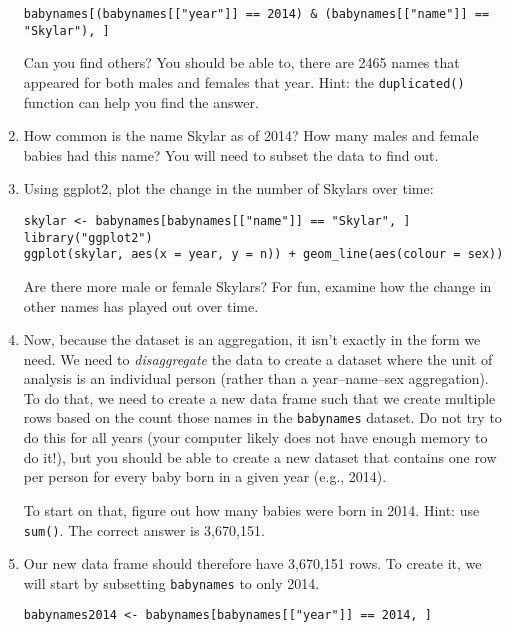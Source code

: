 \documentclass[a4paper,12pt]{article}
\begin{document}
\begin{enumerate}
\begin{verbatim}
babynames[(babynames[["year"]] == 2014) & (babynames[["name"]] == "Skylar"), ]
\end{verbatim}

\noindent Can you find others? You should be able to, there are 2465 names that appeared for both males and females that year. Hint: the \texttt{duplicated()} function can help you find the answer.


\item How common is the name Skylar as of 2014? How many males and female babies had this name? You will need to subset the data to find out.

\item Using ggplot2, plot the change in the number of Skylars over time:

\begin{verbatim}
skylar <- babynames[babynames[["name"]] == "Skylar", ]
library("ggplot2")
ggplot(skylar, aes(x = year, y = n)) + geom_line(aes(colour = sex))
\end{verbatim}

\noindent Are there more male or female Skylars? For fun, examine how the change in other names has played out over time.

\item Now, because the dataset is an aggregation, it isn't exactly in the form we need. We need to \textit{disaggregate} the data to create a dataset where the unit of analysis is an individual person (rather than a year--name--sex aggregation). To do that, we need to create a new data frame such that we create multiple rows based on the count those names in the \texttt{babynames} dataset. Do not try to do this for all years (your computer likely does not have enough memory to do it!), but you should be able to create a new dataset that contains one row per person for every baby born in a given year (e.g., 2014).

To start on that, figure out how many babies were born in 2014. Hint: use \texttt{sum()}. The correct answer is 3,670,151.

\item Our new data frame should therefore have 3,670,151 rows. To create it, we will start by subsetting \texttt{babynames} to only 2014.

\begin{verbatim}
babynames2014 <- babynames[babynames[["year"]] == 2014, ]
\end{verbatim}


\end{enumerate}
\end{document}
